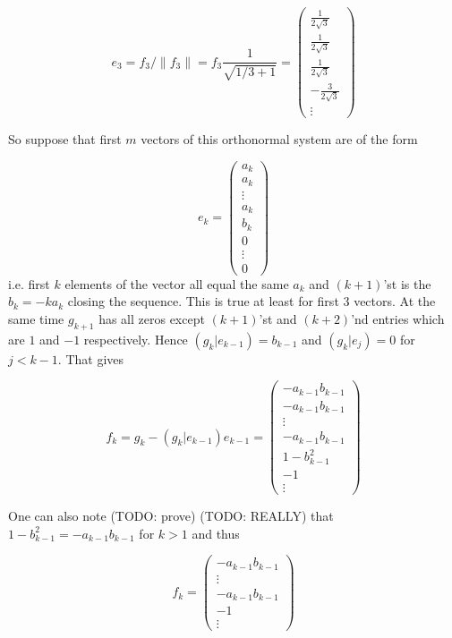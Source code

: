 \documentclass{article}
\begin{document}
    $$e_3 = f_3 / \|f_3\| = f_3 \frac{1}{\sqrt{1/3 + 1}} =
\begin{pmatrix}
    \frac{1}{2\sqrt3} \\ \frac{1}{2\sqrt3} \\
    \frac{1}{2\sqrt3} \\ - \frac{3}{2\sqrt3} \\
    \vdots
\end{pmatrix}$$

So suppose that first $m$ vectors of this orthonormal system
are of the form

$$ e_k =
\begin{pmatrix}
    a_k \\ a_k \\ \vdots \\ a_k \\ b_k \\ 0 \\ \vdots \\ 0
\end{pmatrix}$$
i.e. first $k$ elements of the vector all equal the same $a_k$
and $(k+1)$'st is the $b_k = -ka_k$ closing the sequence.
This is true at least for first 3 vectors.
At the same time $g_{k+1}$ has all zeros
except $(k+1)$'st and $(k+2)$'nd entries which are $1$ and $-1$ respectively.
Hence $\left(g_k|e_{k-1}\right) = b_{k-1}$ and $\left(g_k|e_j\right) = 0$ for $j < k-1$.
That gives

$$f_k = g_k - \left(g_k|e_{k-1}\right) e_{k-1} =
\begin{pmatrix}
    - a_{k-1} b_{k-1} \\
    - a_{k-1} b_{k-1} \\
    \vdots \\
    - a_{k-1} b_{k-1} \\
    1 - b_{k-1}^2     \\
    -1 \\
    \vdots
\end{pmatrix}$$

One can also note (TODO: prove) (TODO: REALLY) that
$1 - b_{k-1}^2 = - a_{k-1} b_{k-1}$ for $k>1$
and thus

$$f_k =
\begin{pmatrix}
    - a_{k-1} b_{k-1} \\
    \vdots \\
    - a_{k-1} b_{k-1} \\
    -1 \\
    \vdots
\end{pmatrix}$$
\end{document}

